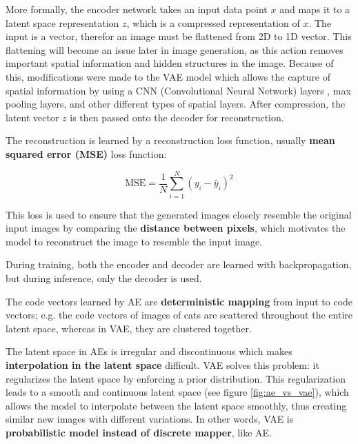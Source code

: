 More formally, the encoder network takes an input data point $x$ and maps it to a latent space representation $z$, which is a compressed representation of $x$. The input is a vector, therefor an image must be flattened from 2D to 1D vector. This flattening will become an issue later in image generation, as this action removes important spatial information and hidden structures in the image. Because of this, modifications were made to the VAE model which allows the capture of spatial information by using a CNN (Convolutional Neural Network) \cite{cnn} layers \cite{vae_cnn_example}, max pooling layers, and other different types of spatial layers. After compression, the latent vector $z$ is then passed onto the decoder for reconstruction. 

The reconstruction is learned by a reconstruction loss function, usually \textbf{mean squared error (MSE)} loss function:

\begin{equation}
    \text{MSE} = \frac{1}{N} \sum_{i=1}^{N} (y_i - \hat{y}_i)^2
\label{eq:mse}
\end{equation}

This loss is used to ensure that the generated images closely resemble the original input images by comparing the \textbf{distance between pixels}, which motivates the model to reconstruct the image to resemble the input image.

During training, both the encoder and decoder are learned with backpropagation, but during inference, only the decoder is used.

The code vectors learned by AE are \textbf{deterministic mapping} from input to code vectors; e.g. the code vectors of images of cats are scattered throughout the entire latent space, whereas in VAE, they are clustered together. 

The latent space in AEs is irregular and discontinuous which makes \textbf{interpolation in the latent space} difficult. VAE solves this problem: it regularizes the latent space by enforcing a prior distribution. This regularization leads to a smooth and continuous latent space (see figure \ref{fig:ae_vs_vae}), which allows the model to interpolate between the latent space smoothly, thus creating similar new images with different variations. In other words, VAE is \textbf{probabilistic model instead of discrete mapper}, like AE.

